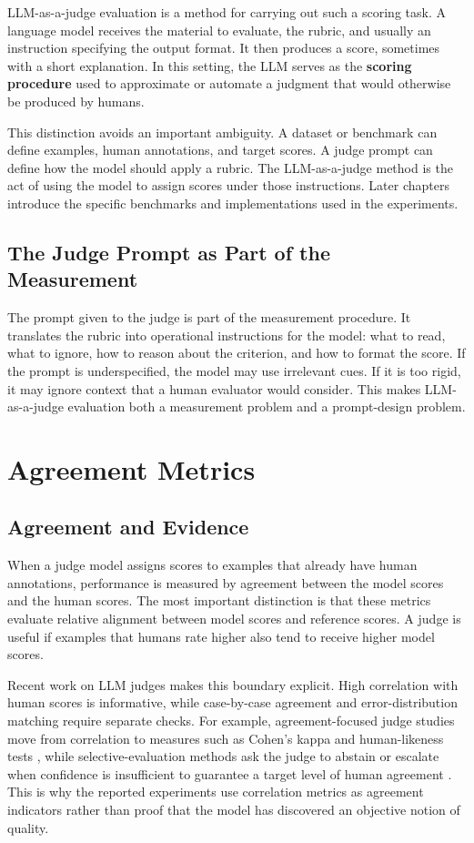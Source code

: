 \documentclass[12pt,a4paper,twoside,openright]{book}
\begin{document}
LLM-as-a-judge evaluation is a method for carrying out such a scoring task. A
language model receives the material to evaluate, the rubric, and usually an
instruction specifying the output format. It then produces a score, sometimes
with a short explanation. In this setting, the LLM serves as the
\textbf{scoring procedure} used to approximate or automate a judgment that would
otherwise be produced by humans.

This distinction avoids an important ambiguity. A dataset or benchmark can
define examples, human annotations, and target scores. A judge prompt can define
how the model should apply a rubric. The LLM-as-a-judge method is the act of
using the model to assign scores under those instructions. Later chapters
introduce the specific benchmarks and implementations used in the experiments.

\subsection{The Judge Prompt as Part of the Measurement}

The prompt given to the judge is part of the measurement procedure. It translates
the rubric into operational instructions for the model: what to read, what to
ignore, how to reason about the criterion, and how to format the score. If the
prompt is underspecified, the model may use irrelevant cues. If it is too rigid,
it may ignore context that a human evaluator would consider. This makes
LLM-as-a-judge evaluation both a measurement problem and a prompt-design
problem.

\section{Agreement Metrics}

\subsection{Agreement and Evidence}

When a judge model assigns scores to examples that already have human
annotations, performance is measured by agreement between the model scores and
the human scores. The most important distinction is that these metrics evaluate
relative alignment between model scores and reference scores. A judge is useful if examples that
humans rate higher also tend to receive higher model scores.

Recent work on LLM judges makes this boundary explicit. High correlation with
human scores is informative, while case-by-case agreement and error-distribution
matching require separate checks. For
example, agreement-focused judge studies move from correlation to measures such
as Cohen's kappa and human-likeness tests
\cite{DBLP:journals/corr/abs-2510-09738}, while selective-evaluation methods ask
the judge to abstain or escalate when confidence is insufficient to guarantee a
target level of human agreement \cite{DBLP:journals/corr/abs-2407-18370}. This
is why the reported experiments use correlation metrics as agreement indicators rather
than proof that the model has discovered an objective notion of quality.
\end{document}
